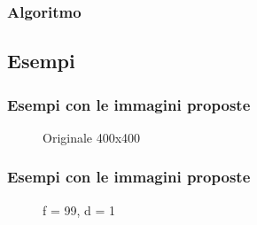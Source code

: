 \documentclass{beamer}
\begin{document}
\begin{frame}
	\frametitle{Algoritmo}
	
\end{frame}

\subsection{Esempi}

\begin{frame}
\frametitle{Esempi con le immagini proposte}
\begin{figure}
		\caption{Originale 400x400}
\end{figure}

\end{frame}

\begin{frame}
	\frametitle{Esempi con le immagini proposte}
	\begin{figure}
		\caption{f = 99, d = 1}
	\end{figure}

\end{frame}	
\end{document}
